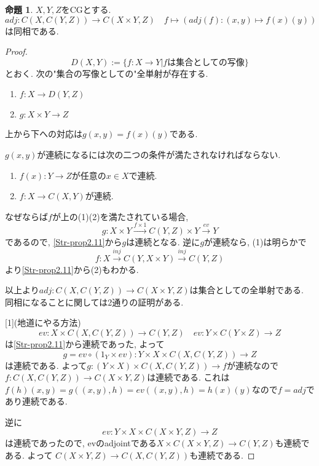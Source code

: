 \documentclass[dvipdfmx,a4paper,11pt]{article}
\theoremstyle{definition}
\newtheorem{prop}[thm]{命題}
\begin{document}
 \begin{tcolorbox}
 [colback = white, colframe = green!35!black, fonttitle = \bfseries,breakable = true]
\begin{prop}\cite[Prop2.１2]{Str}
\label{Str-prop2.12}
$X,Y,Z$をCGとする. 
$$
adj: C(X, C(Y,Z)) \to C(X \times Y, Z)  \quad f \mapsto (adj(f) : (x,y) \mapsto f(x)(y))
$$
は同相である. 
\end{prop}
\end{tcolorbox}

\begin{proof}
$$
D(X,Y):=\{ f : X \to Y| \text{$f$は集合としての写像}\}
$$
とおく.
次の"集合の写像としての"全単射が存在する.
\begin{enumerate}
\item $f : X \to D(Y,Z)$
\item $g : X \times Y \to Z$
\end{enumerate}
上から下への対応は$g(x,y) =f(x)(y)$である.

$g(x,y)$が連続になるには次の二つの条件が満たされなければならない. 
\begin{enumerate}
\item $f(x) : Y \to Z$が任意の$x \in X$で連続.
\item $f : X \to C(X,Y)$が連続.
\end{enumerate}
なぜならば$f$が上の(1)(2)を満たされている場合, 
$$
g : X \times Y \overset{f \times 1}{\longrightarrow}C(Y,Z) \times Y  \overset{ev }{\longrightarrow} Y
$$
であるので, \ref{Str-prop2.11}から$g$は連続となる. 
逆に$g$が連続なら, (1)は明らかで
$$
f : X \overset{inj}{\longrightarrow}C(Y,X \times Y)  \overset{inj}{\longrightarrow} C(Y,Z)
$$
より\ref{Str-prop2.11}から(2)もわかる. 

以上より$adj: C(X, C(Y,Z)) \to C(X \times Y, Z) $は集合としての全単射である. 
同相になることに関しては2通りの証明がある.

[1](地道にやる方法)
$$
ev : X \times C(X, C(Y,Z)) \to C(Y,Z) \quad ev : Y \times C(Y \times Z) \to Z
$$
は\ref{Str-prop2.11}から連続であった, 
よって
$$
g = ev \circ (1_{Y} \times ev) : Y \times X \times C(X,C(Y,Z)) \to Z
$$
は連続である. 
よって$g :  (Y \times X )\times C(X,C(Y,Z)) \to f$が連続なので
$f : C(X,C(Y,Z)) \to C(X \times Y, Z)$は連続である.
これは$f(h)(x,y) = g((x,y), h) = ev((x,y), h) =h(x)(y)$なので$f = adj$であり連続である.

逆に
$$
ev : Y \times X \times C(X\times Y, Z) \to Z
$$
は連続であったので,
evのadjointである$X \times C(X \times Y , Z) \to C(Y,Z)$も連続である.
よって
$C(X \times Y , Z) \to C(X, C(Y,Z))$も連続である.


\end{proof}
\end{document}
